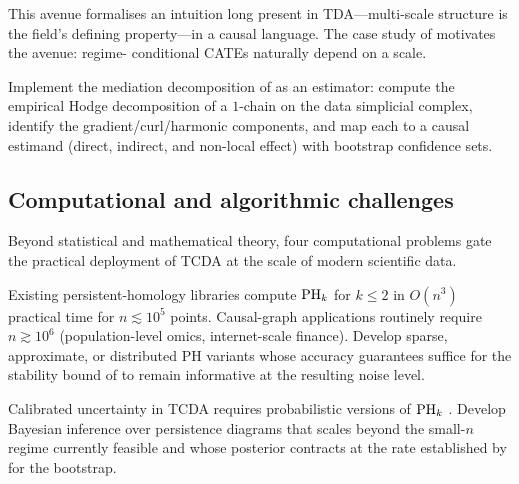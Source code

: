 This avenue formalises an intuition long present in TDA---multi-scale
structure is the field's defining property---in a causal language. The
case study of  motivates the avenue: regime-
conditional CATEs naturally depend on a scale.

\begin{research}
\label{r:hodge-mediation}
Implement the mediation decomposition of 
as an estimator: compute the empirical Hodge decomposition of a $1$-chain
on the data simplicial complex, identify the gradient/curl/harmonic
components, and map each to a causal estimand (direct, indirect, and
non-local effect) with bootstrap confidence sets.
\end{research}

\subsection{Computational and algorithmic challenges}\label{sec:research_compute}

Beyond statistical and mathematical theory, four computational
problems gate the practical deployment of TCDA at the scale of modern
scientific data.

\begin{challenge}
\label{c:scalable-ph}
Existing persistent-homology libraries \citep{bauer2021ripser,
gudhi2021,tauzin2021giotto} compute $\mathrm{PH}_{k}$ for $k \le 2$ in
$O(n^3)$ practical time for $n \lesssim 10^5$ points. Causal-graph
applications routinely require $n \gtrsim 10^6$ (population-level
omics, internet-scale finance). Develop sparse, approximate, or
distributed PH variants whose accuracy guarantees suffice for the
stability bound of  to remain
informative at the resulting noise level.
\end{challenge}

\begin{challenge}\label{c:bayesian-ph}
Calibrated uncertainty in TCDA requires probabilistic versions of
$\mathrm{PH}_{k}$ \citep{maroulas2020bayesian,fasy2014confidence}. Develop
Bayesian inference over persistence diagrams that scales beyond the
small-$n$ regime currently feasible and whose posterior contracts at
the rate established by \citet{lecci2014statistical} for the bootstrap.
\end{challenge}

